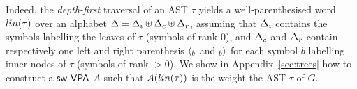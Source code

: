 %
Indeed, the \emph{depth-first} traversal of an AST $\tau$
yields a well-parenthesised word $\lin(\tau)$ over an alphabet
$\Delta = \Deltai \uplus \Deltac \uplus \Deltar$,
assuming \eg that $\Deltai$ contains the symbols labelling the leaves of $\tau$ (symbols of rank $0$),
and $\Deltac$ and $\Deltar$ contain respectively one left and right parenthesis
$\langle_{b}$ and $_{b}{\rangle}$ for each symbol $b$ labelling inner nodes of $\tau$ (symbols of rank $>0$).
%
%
We show in Appendix~\ref{sec:trees} how to construct
a $\textsf{sw-VPA}$ $A$ such that $A(\lin(\tau))$ is the weight the AST $\tau$ of $G$.

%
%
%
%
%
%

